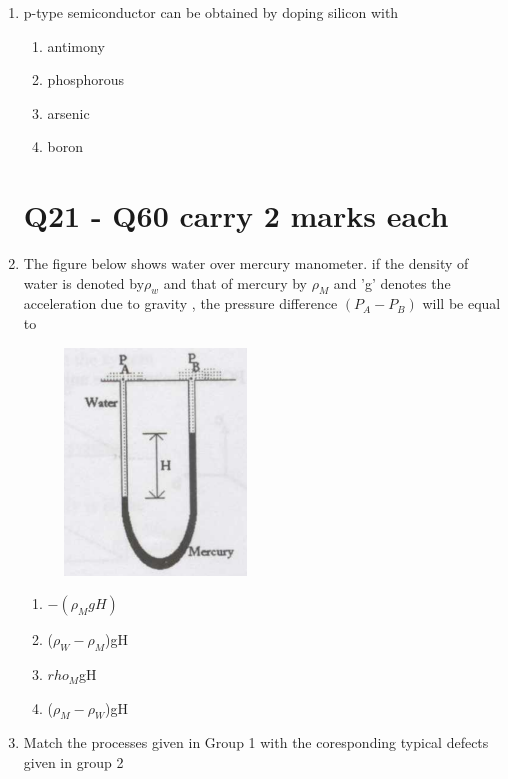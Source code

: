 \documentclass[journal]{IEEEtran}
\theoremstyle{remark}
\begin{document}
\begin{enumerate}
\item p-type semiconductor can be obtained by doping silicon with\hfill{}
\begin{multicols}{4}
\begin{enumerate}
\item antimony
\item phosphorous
\item arsenic
\item boron
\end{enumerate}
\end{multicols}

\section{Q21 - Q60 carry 2 marks each}
\item The figure below shows water over mercury manometer. if the density of water is denoted by$\rho_w$ and that of mercury by $\rho_M$ and 'g' denotes the acceleration due to gravity , the pressure difference $(P_A - P_B)$ will be equal to\hfill{}
\begin{figure}[h]
    \centering
    \includegraphics[width=0.2\linewidth]{figs/Q.21.png}
    \label{fig:placeholder}
\end{figure}
\begin{multicols}{4}
\begin{enumerate}
    \item $-(\rho_M gH)$
    \item ($ \rho_W  -\rho_M$)gH
    \item  $rho_M$gH
    \item ($\rho_M-\rho_W$)gH
\end{enumerate}
\end{multicols}
\item Match the processes given in Group 1 with the coresponding typical defects given in group 2\hfill{}\\
\begin{center}
\begin{tabular}{c c}
 

\end{tabular}
\end{center}
\end{enumerate}
\end{document}
